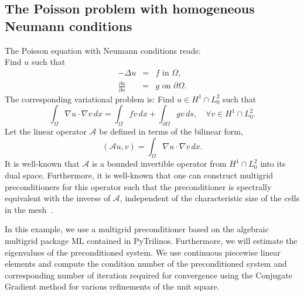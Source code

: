 \subsection{The Poisson problem with homogeneous Neumann conditions}
The Poisson equation with Neumann conditions reads: \\ 
Find $u$ such that
\begin{eqnarray}
-\Delta u &= &f \mbox{ in } \Omega,  \\ 
    \frac{\partial u}{\partial n} &=&  g \mbox{ on } \partial \Omega . 
\end{eqnarray}
The corresponding variational problem is:  Find $u\in H^1 \cap L^2_0$ such that 
\[
\int_\Omega \nabla u \cdot \nabla v \, dx = \int_\Omega f v \, dx + \int_{\partial \Omega} g v \, ds, \quad\forall v \in H^1 \cap L^2_0 .      
\]
Let the linear operator $\mathcal{A}$ be defined in terms of the  bilinear form,  
\[
(\mathcal{A} u, v) =  \int_\Omega \nabla u \cdot \nabla v \, dx.  
\]
It is well-known that 
$\mathcal{A}$ is a bounded invertible operator from $H^1 \cap L^2_0$ into its dual space. 
Furthermore, it is well-known that one can construct multigrid preconditioners for this operator
such that the preconditioner is spectrally equivalent with the inverse of $\mathcal{A}$, independent of the
characteristic size of the cells in the
mesh~\citep{Bramble1993,Hackbusch1994,TrottenbergOosterleeSchuller2001}. 

In this example, we use a multigrid preconditioner based on the algebraic multigrid
package ML contained in PyTrilinos. Furthermore, we will estimate the eigenvalues
of the preconditioned system. We use continuous piecewise linear elements and
compute the condition number of the preconditioned system and corresponding 
number of iteration required for convergence using the Conjugate Gradient method for various refinements of the unit square. 



